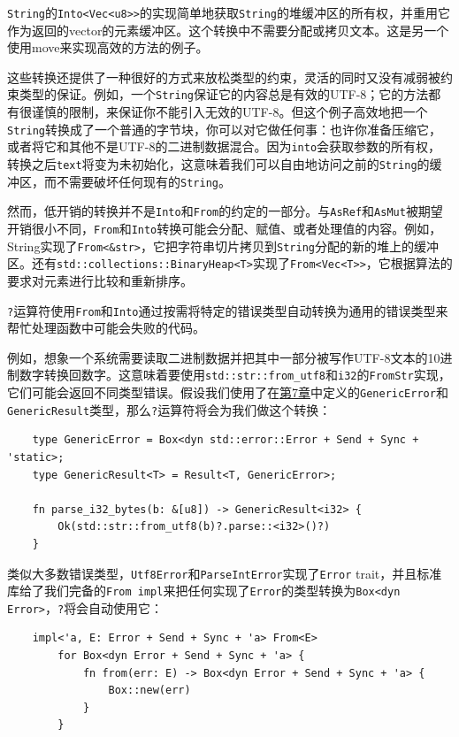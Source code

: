 \texttt{String}的\texttt{Into<Vec<u8>>}的实现简单地获取\texttt{String}的堆缓冲区的所有权，并重用它作为返回的vector的元素缓冲区。这个转换中不需要分配或拷贝文本。这是另一个使用move来实现高效的方法的例子。

这些转换还提供了一种很好的方式来放松类型的约束，灵活的同时又没有减弱被约束类型的保证。例如，一个\texttt{String}保证它的内容总是有效的UTF-8；它的方法都有很谨慎的限制，来保证你不能引入无效的UTF-8。但这个例子高效地把一个\texttt{String}转换成了一个普通的字节块，你可以对它做任何事：也许你准备压缩它，或者将它和其他不是UTF-8的二进制数据混合。因为\texttt{into}会获取参数的所有权，转换之后\texttt{text}将变为未初始化，这意味着我们可以自由地访问之前的\texttt{String}的缓冲区，而不需要破坏任何现有的\texttt{String}。

然而，低开销的转换并不是\texttt{Into}和\texttt{From}的约定的一部分。与\texttt{AsRef}和\texttt{AsMut}被期望开销很小不同，\texttt{From}和\texttt{Into}转换可能会分配、赋值、或者处理值的内容。例如，String实现了\texttt{From<\&str>}，它把字符串切片拷贝到\texttt{String}分配的新的堆上的缓冲区。还有\texttt{std::collections::BinaryHeap<T>}实现了\texttt{From<Vec<T>>}，它根据算法的要求对元素进行比较和重新排序。

\texttt{?}运算符使用\texttt{From}和\texttt{Into}通过按需将特定的错误类型自动转换为通用的错误类型来帮忙处理函数中可能会失败的代码。

例如，想象一个系统需要读取二进制数据并把其中一部分被写作UTF-8文本的10进制数字转换回数字。这意味着要使用\texttt{std::str::from\_utf8}和\texttt{i32}的\texttt{FromStr}实现，它们可能会返回不同类型错误。假设我们使用了在\hyperref[ch07]{第7章}中定义的\texttt{GenericError}和\texttt{GenericResult}类型，那么\texttt{?}运算符将会为我们做这个转换：
\begin{verbatim}
    type GenericError = Box<dyn std::error::Error + Send + Sync + 'static>;
    type GenericResult<T> = Result<T, GenericError>;

    fn parse_i32_bytes(b: &[u8]) -> GenericResult<i32> {
        Ok(std::str::from_utf8(b)?.parse::<i32>()?)
    }
\end{verbatim}

类似大多数错误类型，\texttt{Utf8Error}和\texttt{ParseIntError}实现了\texttt{Error} trait，并且标准库给了我们完备的\texttt{From impl}来把任何实现了\texttt{Error}的类型转换为\texttt{Box<dyn Error>}，\texttt{?}将会自动使用它：
\begin{verbatim}
    impl<'a, E: Error + Send + Sync + 'a> From<E>
        for Box<dyn Error + Send + Sync + 'a> {
            fn from(err: E) -> Box<dyn Error + Send + Sync + 'a> {
                Box::new(err)
            }
        }
\end{verbatim}

